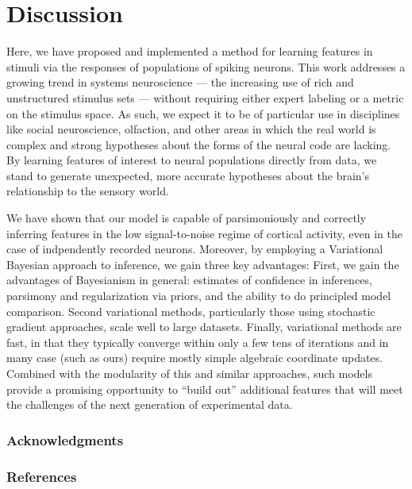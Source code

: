 \documentclass{article} %
\begin{document}
\section{Discussion}
Here, we have proposed and implemented a method for learning features in stimuli via the responses of populations of spiking neurons. This work addresses a growing trend in systems neuroscience --- the increasing use of rich and unstructured stimulus sets --- without requiring either expert labeling or a metric on the stimulus space. As such, we expect it to be of particular use in disciplines like social neuroscience, olfaction, and other areas in which the real world is complex and strong hypotheses about the forms of the neural code are lacking. By learning features of interest to neural populations directly from data, we stand to generate unexpected, more accurate hypotheses about the brain's relationship to the sensory world.

We have shown that our model is capable of parsimoniously and correctly inferring features in the low signal-to-noise regime of cortical activity, even in the case of indpendently recorded neurons. Moreover, by employing a Variational Bayesian approach to inference, we gain three key advantages: First, we gain the advantages of Bayesianism in general: estimates of confidence in inferences, parsimony and regularization via priors, and the ability to do principled model comparison. Second variational methods, particularly those using stochastic gradient approaches, scale well to large datasets. Finally, variational methods are fast, in that they typically converge within only a few tens of iterations and in many case (such as ours) require mostly simple algebraic coordinate updates. Combined with the modularity of this and similar approaches, such models provide a promising opportunity to ``build out'' additional features that will meet the challenges of the next generation of experimental data.



\subsubsection*{Acknowledgments}


\newpage
\subsubsection*{References}
\begingroup
\renewcommand{\section}[2]{}
{}

\endgroup
\end{document}
